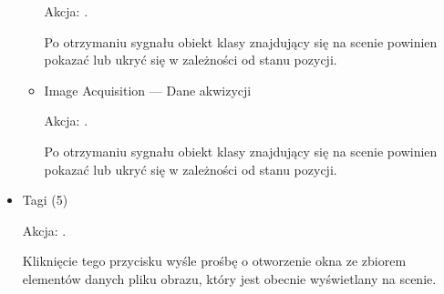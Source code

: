 \begin{itemize}
\begin{itemize}
                    Akcja: .

                    Po otrzymaniu sygnału obiekt klasy  znajdujący się na scenie powinien pokazać lub ukryć się w zależności od stanu pozycji.
              \item Image Acquisition --- Dane akwizycji

                    Akcja: .

                    Po otrzymaniu sygnału obiekt klasy  znajdujący się na scenie powinien pokazać lub ukryć się w zależności od stanu pozycji.

          \end{itemize}

    \item Tagi (5)

          Akcja: .

          Kliknięcie tego przycisku wyśle prośbę o otworzenie okna ze zbiorem elementów danych pliku obrazu, który jest obecnie wyświetlany na scenie.
          
\end{itemize}